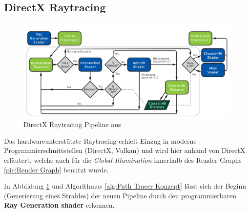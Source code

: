 \subsection{DirectX Raytracing}

\begin{figure}[H]
    \centering
    \includegraphics[width=\linewidth]{content/PathTracer/Bilder/DirectXRaytracingPipeline.png}
    \caption{DirectX Raytracing Pipeline aus \cite{Haines2019}}
    \label{pic:DirectXRaytracingPipeline}
\end{figure}

Das hardwareunterstützte Raytracing erhielt Einzug in moderne Programmierschnittstellen (DirectX, Vulkan) und wird 
hier anhand von DirectX erläutert, welche auch für die \textit{Global Illumination} innerhalb des Render Graphs \ref{pic:Render Graph}
benutzt wurde. 

In Abbildung \ref{pic:DirectXRaytracingPipeline} und  Algorithmus \ref{alg:Path Tracer Konzept} lässt sich
der Beginn (Generierung eines Strahles) der neuen Pipeline durch den programmierbaren
\textbf{Ray Generation shader} erkennen.

